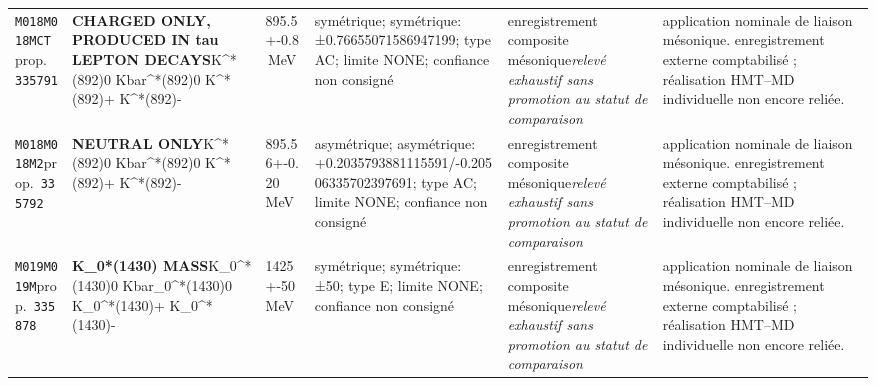 \begin{landscape}
\begin{longtable}{L{1.85cm}L{4.45cm}L{2.35cm}L{4.05cm}L{3.35cm}L{7.15cm}}
\texttt{M018}\newline \texttt{M018MCT}\newline prop.\ \texttt{335791} & \textbf{CHARGED ONLY, PRODUCED IN tau LEPTON DECAYS}\newline K\textasciicircum{}*(892)0 \textbar{}\allowbreak{} Kbar\textasciicircum{}*(892)0 \textbar{}\allowbreak{} K\textasciicircum{}*(892)+ \textbar{}\allowbreak{} K\textasciicircum{}*(892)- & 895.5+-0.8\,MeV & symétrique; symétrique: ±0.76655071586947199; type AC; limite NONE; confiance non consigné & enregistrement composite mésonique\newline \emph{relevé exhaustif sans promotion au statut de comparaison} & application nominale de liaison mésonique. enregistrement externe comptabilisé ; réalisation HMT--MD individuelle non encore reliée. \\
\texttt{M018}\newline \texttt{M018M2}\newline prop.\ \texttt{335792} & \textbf{NEUTRAL ONLY}\newline K\textasciicircum{}*(892)0 \textbar{}\allowbreak{} Kbar\textasciicircum{}*(892)0 \textbar{}\allowbreak{} K\textasciicircum{}*(892)+ \textbar{}\allowbreak{} K\textasciicircum{}*(892)- & 895.56+-0.20\,MeV & asymétrique; asymétrique: +0.2035793881115591/-0.20506335702397691; type AC; limite NONE; confiance non consigné & enregistrement composite mésonique\newline \emph{relevé exhaustif sans promotion au statut de comparaison} & application nominale de liaison mésonique. enregistrement externe comptabilisé ; réalisation HMT--MD individuelle non encore reliée. \\
\texttt{M019}\newline \texttt{M019M}\newline prop.\ \texttt{335878} & \textbf{K\_\allowbreak{}0*(1430) MASS}\newline K\_\allowbreak{}0\textasciicircum{}*(1430)0 \textbar{}\allowbreak{} Kbar\_\allowbreak{}0\textasciicircum{}*(1430)0 \textbar{}\allowbreak{} K\_\allowbreak{}0\textasciicircum{}*(1430)+ \textbar{}\allowbreak{} K\_\allowbreak{}0\textasciicircum{}*(1430)- & 1425+-50\,MeV & symétrique; symétrique: ±50; type E; limite NONE; confiance non consigné & enregistrement composite mésonique\newline \emph{relevé exhaustif sans promotion au statut de comparaison} & application nominale de liaison mésonique. enregistrement externe comptabilisé ; réalisation HMT--MD individuelle non encore reliée. \\

\end{longtable}
\end{landscape}
